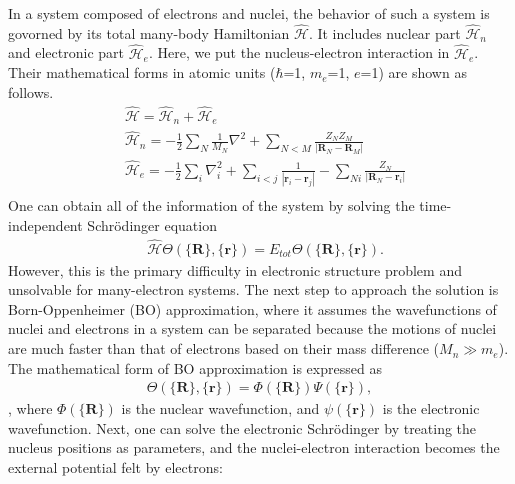 In a system composed of electrons and nuclei, the behavior of such a system is govorned by its total many-body Hamiltonian $\hat{\mathcal{H}}$. It includes nuclear part $\hat{\mathcal{H}}_n$ and electronic part $\hat{\mathcal{H}}_e$. Here, we put the nucleus-electron interaction in $\hat{\mathcal{H}}_{e}$. Their mathematical forms in atomic units ($\hbar$=1, $m_e$=1, $e$=1) are shown as follows.
	\begin{equation}
	\begin{aligned}
        &\hat{\mathcal{H}} = \hat{\mathcal{H}}_{n} + \hat{\mathcal{H}}_{e} \\
        &\hat{\mathcal{H}}_{n} = -\frac{1}{2}\sum_N \frac{1}{M_N}\nabla^2 + \sum_{N<M} \frac{Z_NZ_M}{\left| \textbf{R}_N-\textbf{R}_M \right|}\\
        &\hat{\mathcal{H}}_{e} = -\frac{1}{2}\sum_i \nabla_i^2 + \sum_{i<j} \frac{1}{\left| \textbf{r}_i-\textbf{r}_j \right|} -\sum_{Ni} \frac{Z_N}{\left| \textbf{R}_N-\textbf{r}_i \right|} \\
	\end{aligned}
	\end{equation}
One can obtain all of the information of the system by solving the time-independent Schr\"{o}dinger equation
	\begin{equation}
	\begin{aligned}
        & \hat{\mathcal{H}}\Theta(\{\textbf{R}\},\{\textbf{r}\}) = E_{tot}\Theta(\{\textbf{R}\},\{\textbf{r}\}).
	\end{aligned}
	\end{equation}
However, this is the primary difficulty in electronic structure problem and unsolvable for many-electron systems. The next step to approach the solution is Born-Oppenheimer (BO) approximation, where it assumes the wavefunctions of nuclei and electrons in a system can be separated because the motions of nuclei are much faster than that of electrons based on their mass difference ($M_n \gg m_e$). The mathematical form of BO approximation is expressed as
	\begin{equation}
	\begin{aligned}
        \Theta(\{\textbf{R}\},\{\textbf{r}\}) = \Phi(\{\textbf{R}\})\Psi(\{\textbf{r}\}),
    \end{aligned}
	\end{equation},
where $\Phi(\{\textbf{R}\})$ is the nuclear wavefunction, and $\psi(\{\textbf{r}\})$ is the electronic wavefunction. Next, one can solve the electronic Schr\"{o}dinger by treating the nucleus positions as parameters, and the nuclei-electron interaction becomes the external potential felt by electrons:
